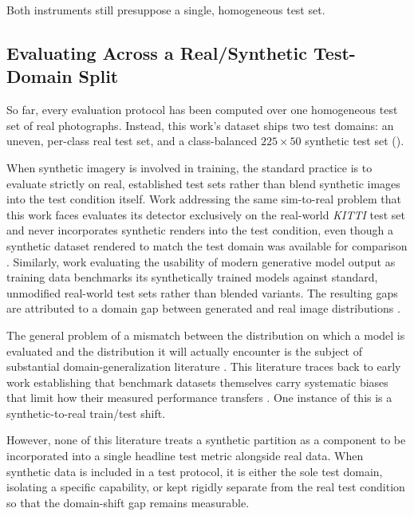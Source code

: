 Both instruments still presuppose a single, homogeneous test set.

\subsection{Evaluating Across a Real/Synthetic Test-Domain Split}\label{sec:lit_real_synthetic_evaluation}

So far, every evaluation protocol has been computed over one homogeneous test set of real photographs. Instead, this work's dataset ships two test domains: an uneven, per-class real test set, and a class-balanced $225\times50$ synthetic test set ().

When synthetic imagery is involved in training, the standard practice is to evaluate strictly on real, established test sets rather than blend synthetic images into the test condition itself. Work addressing the same sim-to-real problem that this work faces evaluates its detector exclusively on the real-world \textit{KITTI} test set and never incorporates synthetic renders into the test condition, even though a synthetic dataset rendered to match the test domain was available for comparison \cite{tremblayTrainingDeepNetworks2018}. Similarly, work evaluating the usability of modern generative model output as training data benchmarks its synthetically trained models against standard, unmodified real-world test sets rather than blended variants. The resulting gaps are attributed to a domain gap between generated and real image distributions \cite{heSyntheticDataGenerative2023}.

The general problem of a mismatch between the distribution on which a model is evaluated and the distribution it will actually encounter is the subject of substantial domain-generalization literature \cite{zhouDomainGeneralizationSurvey2023}. This literature traces back to early work establishing that benchmark datasets themselves carry systematic biases that limit how their measured performance transfers \cite{UnbiasedLookDataset}. One instance of this is a synthetic-to-real train/test shift.

However, none of this literature treats a synthetic partition as a component to be incorporated into a single headline test metric alongside real data. When synthetic data is included in a test protocol, it is either the sole test domain, isolating a specific capability, or kept rigidly separate from the real test condition so that the domain-shift gap remains measurable.

